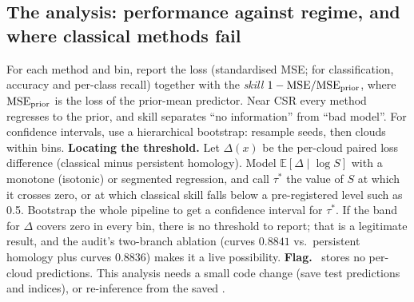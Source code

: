 \documentclass[10pt,a4paper]{article}
\newcommand{\code}[1]{\texttt{\detokenize{#1}}}
\newcommand{\flag}{\textcolor{red!65!black}{\textbf{Flag.}}\ }
\newcommand{\E}{\mathbb{E}}
\begin{document}
\subsection{The analysis: performance against regime, and where classical methods fail}\label{sec:analysis}
For each method and bin, report the loss (standardised MSE; for classification, accuracy and per-class recall) together with the \emph{skill} $1-\mathrm{MSE}/\mathrm{MSE}_{\rm prior}$, where $\mathrm{MSE}_{\rm prior}$ is the loss of the prior-mean predictor. Near CSR every method regresses to the prior, and skill separates ``no information'' from ``bad model''. For confidence intervals, use a hierarchical bootstrap: resample seeds, then clouds within bins.
\textbf{Locating the threshold.} Let $\Delta(x)$ be the per-cloud paired loss difference (classical minus persistent homology). Model $\E[\Delta\mid\log S]$ with a monotone (isotonic) or segmented regression, and call $\tau^\ast$ the value of $S$ at which it crosses zero, or at which classical skill falls below a pre-registered level such as 0.5. Bootstrap the whole pipeline to get a confidence interval for $\tau^\ast$. If the band for $\Delta$ covers zero in every bin, there is no threshold to report; that is a legitimate result, and the audit's two-branch ablation (curves $0.8841$ vs.\ persistent homology plus curves $0.8836$) makes it a live possibility.
\flag \code{results.pt} stores no per-cloud predictions. This analysis needs a small code change (save test predictions and indices), or re-inference from the saved \code{model_state}.
\end{document}
